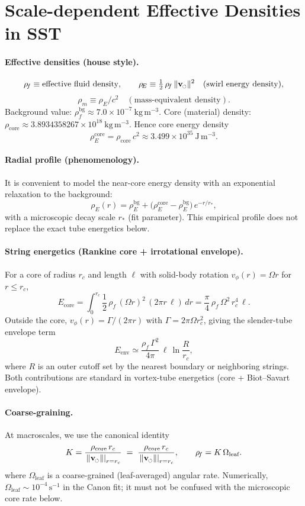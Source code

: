 \documentclass[11pt]{article}
\newcommand{\vscore}{v_s}                                %
\newcommand{\vnorm}{\lVert \mathbf{v}_{\mkern-2mu\scriptscriptstyle\boldsymbol{\circlearrowleft}} \rVert}               %
\newcommand{\rhoF}{\rho_{\!f}}                           %
\newcommand{\rhoE}{\rho_{\!E}}                           %
\newcommand{\rhoM}{\rho_{\!m}}                           %
\newcommand{\rhoC}{\rho_{\mathrm{core}}}                 %
\providecommand{\rc}{r_c} %
\newcommand{\vcore}{\left.\vnorm\right|_{r=\rc}}        %
\renewcommand{\vscore}{\vcore}
\begin{document}
	\section*{Scale-dependent Effective Densities in SST}
	\paragraph{Effective densities (house style).}
	\[
		\rhoF \equiv \text{effective fluid density},\qquad
		\rhoE \equiv \tfrac12\,\rhoF\,\vnorm^{2}\quad(\text{swirl energy density}),
	\]\[
	  	\rhoM \equiv \rhoE/c^{2}\quad(\text{mass-equivalent density}).
	\]
	Background value: $\rhoF^{\mathrm{bg}}\approx 7.0\times 10^{-7}\ \mathrm{kg\,m^{-3}}$.
	Core (material) density: $\rhoC\approx 3.8934358267\times 10^{18}\ \mathrm{kg\,m^{-3}}$.
	Hence core energy density
	\[
		\rhoE^{\text{core}}=\rhoC\,c^{2}\approx 3.499\times 10^{35}\ \mathrm{J\,m^{-3}}.
	\]

	\paragraph{Radial profile (phenomenology).}
	It is convenient to model the near-core energy density with an exponential relaxation to the background:
	\[
		\rhoE(r)=\rhoE^{\mathrm{bg}}+\bigl(\rhoE^{\text{core}}-\rhoE^{\mathrm{bg}}\bigr)\,e^{-r/r_\ast},
	\]
	with a microscopic decay scale $r_\ast$ (fit parameter). This empirical profile does not replace the exact tube energetics below.

	\paragraph{String energetics (Rankine core + irrotational envelope).}
	For a core of radius $r_c$ and length $\ell$ with solid-body rotation $v_\phi(r)=\Omega r$ for $r\le r_c$,
	\[
		E_{\text{core}}
		=\int_{0}^{r_c}\!\!\frac12\,\rhoF\,(\Omega r)^2\,(2\pi r\,\ell)\,dr
		=\frac{\pi}{4}\,\rhoF\,\Omega^2\,r_c^4\,\ell.
	\]
	Outside the core, $v_\phi(r)=\Gamma/(2\pi r)$ with $\Gamma=2\pi\Omega r_c^{2}$, giving the slender-tube envelope term
	\[
		E_{\text{env}}\simeq \frac{\rhoF\,\Gamma^2}{4\pi}\,\ell\,\ln\!\frac{R}{r_c},
	\]
	where $R$ is an outer cutoff set by the nearest boundary or neighboring strings. Both contributions are standard in vortex-tube energetics (core + Biot–Savart envelope).

	\paragraph{Coarse-graining.}
	At macroscales, we use the canonical identity
	\[
		K=\frac{\rhoC\,r_c}{\vscore}\;=\;\frac{\rhoC\,\rc}{\left.\vnorm\right|_{r=\rc}},\qquad \rhoF=K\,\Omega_{\text{leaf}}.
	\]
	where $\Omega_{\text{leaf}}$ is a coarse-grained (leaf-averaged) angular rate. Numerically, $\Omega_{\text{leaf}}\sim 10^{-4}\,\mathrm{s^{-1}}$ in the Canon fit; it must not be confused with the microscopic core rate below.
\end{document}
